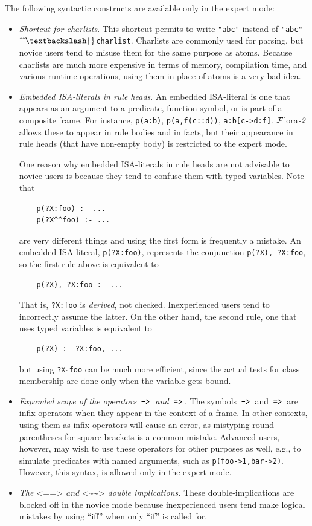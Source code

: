 \documentclass[11pt]{article}
\newcommand{\FLORA}{{\mbox{\sc ${\cal F}${lora}\rm\emph{-2}}}\xspace}
\newcommand{\FLSYSTEM}{\FLORA}
\newcommand{\mvd}{{\mbox{\tt \,->\,}}}  %
\newcommand{\Mvd}{{\mbox{\tt \,=>\,}}}  %
\newcommand{\rlnafarr}{\texttt{<\textasciitilde\textasciitilde>}}
\newcommand{\rlnegarr}{\texttt{<==>}}
\newcommand{\bs}{\textbackslash}
\begin{document}
The following syntactic constructs are available only in the expert mode:
\begin{itemize}
\item  \emph{Shortcut for charlists}.
  This shortcut permits to write \texttt{"abc"} instead of
  \texttt{"abc"$\hat{~}\hat{~}\bs{}$charlist}. Charlists are commonly used
  for parsing, but novice users tend to misuse them for the same purpose as
  atoms.  Because charlists are much more expensive in terms of memory,
  compilation time, and various runtime operations, using them in place of
  atoms is a very bad idea.
\item  \emph{Embedded ISA-literals in rule heads}.
   An embedded ISA-literal is one that appears as an argument to a
   predicate, function symbol, or is part of a composite frame. For instance,
   \texttt{p(a:b)}, \texttt{p(a,f(c::d))}, \texttt{a:b[c->d:f]}.
   \FLSYSTEM allows these to appear in rule bodies and in facts, but their
   appearance in rule heads (that have non-empty body) is restricted to the
   expert mode.

   One reason why embedded ISA-literals in rule heads
   are not advisable to novice users is because they tend to confuse them
   with typed variables. Note that
\begin{verbatim}
    p(?X:foo) :- ...
    p(?X^^foo) :- ...
\end{verbatim}
   are very different things and using the first form is frequently a mistake.
   An embedded ISA-literal, \texttt{p(?X:foo)},
   represents the conjunction \texttt{p(?X), ?X:foo}, so
   the first rule above is equivalent to
\begin{verbatim}
    p(?X), ?X:foo :- ...
\end{verbatim}
   That is, \texttt{?X:foo} is \emph{derived}, not checked.
   Inexperienced users tend to incorrectly assume the latter.
   On the other hand, the second rule, one
   that uses typed variables is equivalent to
\begin{verbatim}
    p(?X) :- ?X:foo, ...
\end{verbatim}
   but using \texttt{?X$\hat{~}\hat{~}$foo} can be much
   more efficient, since the actual tests for class membership are done only
   when the variable gets bound. 
\item  \emph{Expanded scope of the operators $\mvd$ and $\Mvd$.}
  The symbols $\mvd$ and $\Mvd$ are infix operators when they appear in the
  context of a frame.  In other contexts, using them as infix operators
  will cause an error, as mistyping round parentheses for square brackets
  is a common mistake. Advanced users, however, may wish to use these
  operators for other purposes as well, e.g., to simulate predicates with
  named arguments, such as \texttt{p(foo->1,bar->2)}. 
  However, this syntax, is allowed only in the expert mode.
  \index{$\rlnegarr$}
  \index{$\rlnafarr$}
\item \emph{The $\rlnegarr$ and $\rlnafarr$ double implications.}  
  These double-implications are blocked off in the novice mode because
  inexperienced users tend make logical mistakes by using ``iff'' when only
  ``if'' is called for.
\end{itemize}
\end{document}
